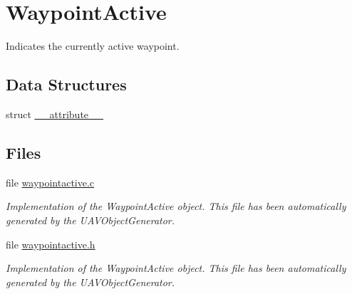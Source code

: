 \hypertarget{group___waypoint_active}{\section{\-Waypoint\-Active}
\label{group___waypoint_active}
}


\-Indicates the currently active waypoint.  


\subsection*{\-Data \-Structures}
\begin{DoxyCompactItemize}
\item 
struct \hyperlink{struct____attribute____}{\-\_\-\-\_\-attribute\-\_\-\-\_\-}
\end{DoxyCompactItemize}
\subsection*{\-Files}
\begin{DoxyCompactItemize}
\item 
file \hyperlink{waypointactive_8c}{waypointactive.\-c}
\begin{DoxyCompactList}\small\item\em \-Implementation of the \-Waypoint\-Active object. \-This file has been automatically generated by the \-U\-A\-V\-Object\-Generator. \end{DoxyCompactList}\item 
file \hyperlink{waypointactive_8h}{waypointactive.\-h}
\begin{DoxyCompactList}\small\item\em \-Implementation of the \-Waypoint\-Active object. \-This file has been automatically generated by the \-U\-A\-V\-Object\-Generator. \end{DoxyCompactList}\end{DoxyCompactItemize}
